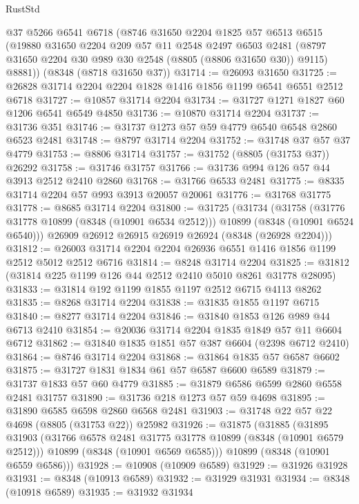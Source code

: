 \begin{lexlean}{RustStd}
\begin{coremodule}
    @37
    @5266
    @6541
    @6718
    (@8746
      @31650
      @2204
      @1825
      @57
      @6513
      @6515
      (@19880
        @31650
        @2204
        @209
        @57
        @11
        @2548
        @2497
        @6503
        @2481
        (@8797 @31650 @2204 @30 @989 @30 @2548 (@8805 (@8806 @31650 @30)) @9115)
        @8881))
    (@8348 (@8718 @31650 @37))
@31714 := @26093 @31650
@31725 := @26828 @31714 @2204 @2204 @1828 @1416 @1856 @1199 @6541 @6551 @2512 @6718
@31727 := @10857 @31714 @2204
@31734 := @31727 @1271 @1827 @60 @1206 @6541 @6549 @4850
@31736 := @10870 @31714 @2204
@31737 := @31736 @351
@31746 := @31737 @1273 @57 @59 @4779 @6540 @6548 @2860 @6523 @2481
@31748 := @8797 @31714 @2204
@31752 := @31748 @37 @57 @37 @4779
@31753 := @8806 @31714
@31757 := @31752 (@8805 (@31753 @37)) @26292
@31758 := @31746 @31757
@31766 := @31736 @994 @126 @57 @44 @3913 @2512 @2410 @2860
@31768 := @31766 @6533 @2481
@31775 := @8335 @31714 @2204 @57 @993 @3913 @20057 @20061
@31776 := @31768 @31775
@31778 := @8685 @31714 @2204
@31800 := @31725
    (@31734
      (@31758
        (@31776 @31778 @10899 (@8348 (@10901 @6534 @2512)))
        @10899
        (@8348 (@10901 @6524 @6540)))
      @26909
      @26912
      @26915
      @26919
      @26924
      (@8348 (@26928 @2204)))
@31812 := @26003 @31714 @2204 @2204 @26936 @6551 @1416 @1856 @1199 @2512 @5012 @2512 @6716
@31814 := @8248 @31714 @2204
@31825 := @31812 (@31814 @225 @1199 @126 @44 @2512 @2410 @5010 @8261 @31778 @28095)
@31833 := @31814 @192 @1199 @1855 @1197 @2512 @6715 @4113 @8262
@31835 := @8268 @31714 @2204
@31838 := @31835 @1855 @1197 @6715
@31840 := @8277 @31714 @2204
@31846 := @31840 @1853 @126 @989 @44 @6713 @2410
@31854 := @20036 @31714 @2204 @1835 @1849 @57 @11 @6604 @6712
@31862 := @31840 @1835 @1851 @57 @387 @6604 (@2398 @6712 @2410)
@31864 := @8746 @31714 @2204
@31868 := @31864 @1835 @57 @6587 @6602
@31875 := @31727 @1831 @1834 @61 @57 @6587 @6600 @6589
@31879 := @31737 @1833 @57 @60 @4779
@31885 := @31879 @6586 @6599 @2860 @6558 @2481 @31757
@31890 := @31736 @218 @1273 @57 @59 @4698
@31895 := @31890 @6585 @6598 @2860 @6568 @2481
@31903 := @31748 @22 @57 @22 @4698 (@8805 (@31753 @22)) @25982
@31926 := @31875
    (@31885
      (@31895
        @31903
        (@31766 @6578 @2481 @31775 @31778 @10899 (@8348 (@10901 @6579 @2512)))
        @10899
        (@8348 (@10901 @6569 @6585)))
      @10899
      (@8348 (@10901 @6559 @6586)))
@31928 := @10908 (@10909 @6589)
@31929 := @31926 @31928
@31931 := @8348 (@10913 @6589)
@31932 := @31929 @31931
@31934 := @8348 (@10918 @6589)
@31935 := @31932 @31934

\end{coremodule}
\end{lexlean}
